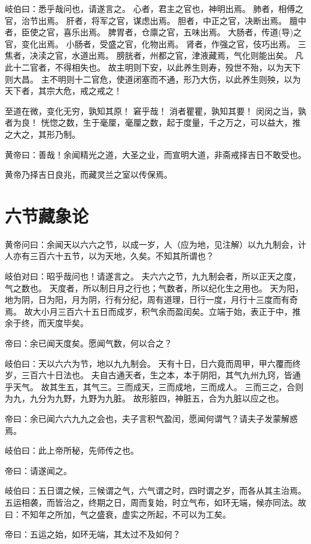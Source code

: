 \documentclass{article}%
\begin{document}
岐伯曰：悉乎哉问也，请遂言之。
心者，君主之官也，神明出焉。
肺者，相傅之官，治节出焉。
肝者，将军之官，谋虑出焉。
胆者，中正之官，决断出焉。
膻中者，臣使之官，喜乐出焉。
脾胃者，仓廪之官，五味出焉。
大肠者，传道(导)之官，变化出焉。
小肠者，受盛之官，化物出焉。
肾者，作强之官，伎巧出焉。
三焦者，决渎之官，水道出焉。
膀胱者，州都之官，津液藏焉，气化则能出矣。
凡此十二官者，不得相失也。
故主明则下安，以此养生则寿，殁世不殆，以为天下则大昌。
主不明则十二官危，使道闭塞而不通，形乃大伤，以此养生则殃，以为天下者，其宗大危，戒之戒之！

至道在微，变化无穷，孰知其原！
窘乎哉！
消者瞿瞿，孰知其要！
闵闵之当，孰者为良！
恍惚之数，生于毫厘，毫厘之数，起于度量，千之万之，可以益大，推之大之，其形乃制。

黄帝曰：善哉！余闻精光之道，大圣之业，而宣明大道，非斋戒择吉日不敢受也。

黄帝乃择吉日良兆，而藏灵兰之室以传保焉。


\section{六节藏象论}
黄帝问曰：余闻天以六六之节，以成一岁，人（应为地，见注解）以九九制会，计人亦有三百六十五节，以为天地，久矣。不知其所谓也？

岐伯对曰：昭乎哉问也！请遂言之。
夫六六之节，九九制会者，所以正天之度，气之数也。
天度者，所以制日月之行也；气数者，所以纪化生之用也。
天为阳，地为阴，日为阳，月为阴，行有分纪，周有道理，日行一度，月行十三度而有奇焉。
故大小月三百六十五日而成岁，积气余而盈闰矣。立端于始，表正于中，推余于终，而天度毕矣。

帝曰：余已闻天度矣。愿闻气数，何以合之？

岐伯曰：天以六六为节，地以九九制会。
天有十日，日六竟而周甲，甲六覆而终岁，三百六十日法也。
夫自古通天者，生之本，本于阴阳，其气九州九窍，皆通乎天气。
故其生五，其气三。三而成天，三而成地，三而成人。
三而三之，合则为九，九分为九野，九野为九脏。
故形脏四，神脏五，合为九脏以应之也。

帝曰：余已闻六六九九之会也，夫子言积气盈闰，愿闻何谓气？请夫子发蒙解惑焉。

岐伯曰：此上帝所秘，先师传之也。

帝曰：请遂闻之。

岐伯曰：五日谓之候，三候谓之气，六气谓之时，四时谓之岁，而各从其主治焉。五运相袭，而皆治之，终期之日，周而复始，时立气布，如环无端，候亦同法。故曰：不知年之所加，气之盛衰，虚实之所起，不可以为工矣。

帝曰：五运之始，如环无端，其太过不及如何？
\end{document}
